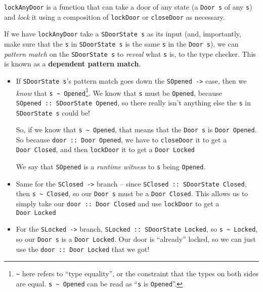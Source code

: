 \documentclass[]{article}
\begin{document}
\texttt{lockAnyDoor} is a function that can take a door of any state (a
\texttt{Door\ s} of any \texttt{s}) and \emph{lock} it using a composition of
\texttt{lockDoor} or \texttt{closeDoor} as necessary.

If we have \texttt{lockAnyDoor} take a \texttt{SDoorState\ s} as its input (and,
importantly, make sure that the \texttt{s} in \texttt{SDoorState\ s} is the same
\texttt{s} in the \texttt{Door\ s}), we can \emph{pattern match} on the
\texttt{SDoorState\ s} to \emph{reveal} what \texttt{s} is, to the type checker.
This is known as a \textbf{dependent pattern match}.

\begin{itemize}
\item
  If \texttt{SDoorState\ s}'s pattern match goes down the
  \texttt{SOpened\ -\textgreater{}} case, then we \emph{know} that
  \texttt{s\ \textasciitilde{}\ \textquotesingle{}Opened}\footnote{\texttt{\textasciitilde{}}
    here refers to ``type equality'', or the constraint that the types on both
    sides are equal. \texttt{s\ \textasciitilde{}\ \textquotesingle{}Opened} can
    be read as ``\texttt{s} is \texttt{\textquotesingle{}Opened}''.}. We know
  that \texttt{s} must be \texttt{\textquotesingle{}Opened}, because
  \texttt{SOpened\ ::\ SDoorState\ \textquotesingle{}Opened}, so there really
  isn't anything else the \texttt{s} in \texttt{SDoorState\ s} could be!

  So, if we know that \texttt{s\ \textasciitilde{}\ \textquotesingle{}Opened},
  that means that the \texttt{Door\ s} is
  \texttt{Door\ \textquotesingle{}Opened}. So because
  \texttt{door\ ::\ Door\textquotesingle{}\ Opened}, we have to
  \texttt{closeDoor} it to get a \texttt{Door\textquotesingle{}\ Closed}, and
  then \texttt{lockDoor} it to get a \texttt{Door\ \textquotesingle{}Locked}

  We say that \texttt{SOpened} is a \emph{runtime witness} to \texttt{s} being
  \texttt{\textquotesingle{}Opened}.
\item
  Same for the \texttt{SClosed\ -\textgreater{}} branch -- since
  \texttt{SClosed\ ::\ SDoorState\ \textquotesingle{}Closed}, then
  \texttt{s\ \textasciitilde{}\ \textquotesingle{}Closed}, so our
  \texttt{Door\ s} must be a \texttt{Door\ \textquotesingle{}Closed}. This
  allows us to simply take our \texttt{door\ ::\ Door\ \textquotesingle{}Closed}
  and use \texttt{lockDoor} to get a \texttt{Door\ \textquotesingle{}Locked}
\item
  For the \texttt{SLocked\ -\textgreater{}} branch,
  \texttt{SLocked\ ::\ SDoorState\ \textquotesingle{}Locked}, so
  \texttt{s\ \textasciitilde{}\ \textquotesingle{}Locked}, so our
  \texttt{Door\ s} is a \texttt{Door\ \textquotesingle{}Locked}. Our door is
  ``already'' locked, so we can just use the
  \texttt{door\ ::\ Door\ \textquotesingle{}Locked} that we got!
\end{itemize}
\end{document}
